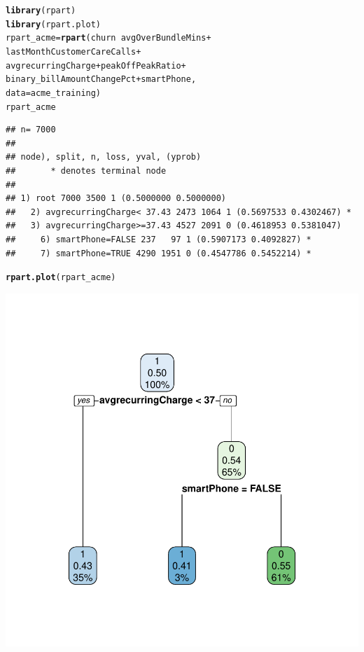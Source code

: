 \documentclass{article}\usepackage[]{graphicx}\usepackage[]{xcolor}
\makeatletter
\newcommand{\hlopt}[1]{\textcolor[rgb]{0,0,0}{#1}}%
\newcommand{\hlstd}[1]{\textcolor[rgb]{0.345,0.345,0.345}{#1}}%
\newcommand{\hlkwb}[1]{\textcolor[rgb]{0.69,0.353,0.396}{#1}}%
\newcommand{\hlkwc}[1]{\textcolor[rgb]{0.333,0.667,0.333}{#1}}%
\newcommand{\hlkwd}[1]{\textcolor[rgb]{0.737,0.353,0.396}{\textbf{#1}}}%
\newenvironment{kframe}{%
 \def\at@end@of@kframe{}%
 \ifinner\ifhmode%
  \def\at@end@of@kframe{\end{minipage}}%
  \begin{minipage}{\columnwidth}%
 \fi\fi%
 \def\FrameCommand##1{\hskip\@totalleftmargin \hskip-\fboxsep
 \colorbox{shadecolor}{##1}\hskip-\fboxsep
     \hskip-\linewidth \hskip-\@totalleftmargin \hskip\columnwidth}%
 \MakeFramed {\advance\hsize-\width
   \@totalleftmargin\z@ \linewidth\hsize
   \@setminipage}}%
 {\par\unskip\endMakeFramed%
 \at@end@of@kframe}
\newenvironment{knitrout}{}{} %
\makeatother
\begin{document}
\begin{knitrout}
{}


\begin{kframe}\begin{alltt}
\hlkwd{library}\hlstd{(rpart)}
\hlkwd{library}\hlstd{(rpart.plot)}
\hlstd{rpart_acme} \hlkwb{=} \hlkwd{rpart}\hlstd{(churn} \hlopt{~} \hlstd{avgOverBundleMins} \hlopt{+}
                     \hlstd{lastMonthCustomerCareCalls} \hlopt{+}
                     \hlstd{avgrecurringCharge} \hlopt{+} \hlstd{peakOffPeakRatio} \hlopt{+}
                     \hlstd{binary_billAmountChangePct} \hlopt{+} \hlstd{smartPhone,}
                   \hlkwc{data}\hlstd{=acme_training)}
\hlstd{rpart_acme}
\end{alltt}
\begin{verbatim}
## n= 7000 
## 
## node), split, n, loss, yval, (yprob)
##       * denotes terminal node
## 
## 1) root 7000 3500 1 (0.5000000 0.5000000)  
##   2) avgrecurringCharge< 37.43 2473 1064 1 (0.5697533 0.4302467) *
##   3) avgrecurringCharge>=37.43 4527 2091 0 (0.4618953 0.5381047)  
##     6) smartPhone=FALSE 237   97 1 (0.5907173 0.4092827) *
##     7) smartPhone=TRUE 4290 1951 0 (0.4547786 0.5452214) *
\end{verbatim}
\begin{alltt}
\hlkwd{rpart.plot}\hlstd{(rpart_acme)}
\end{alltt}
\end{kframe}

{\centering \includegraphics[width=.6\linewidth]{figure/RF1-SOLUCION-Rnwauto-report-3} 

}



\end{knitrout}
\end{document}
